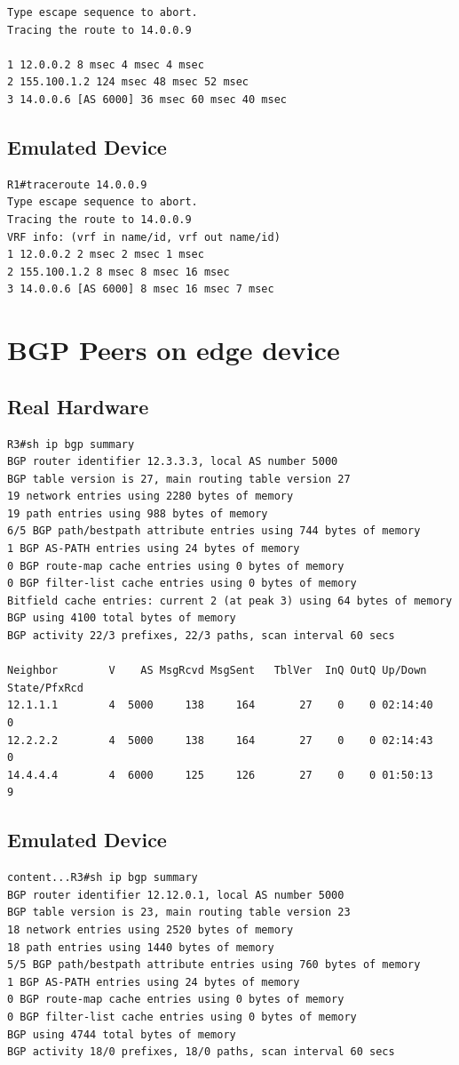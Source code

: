 \documentclass[11pt]{report}
\begin{document}
\begin{appendices}
\begin{lstlisting}
Type escape sequence to abort.
Tracing the route to 14.0.0.9

1 12.0.0.2 8 msec 4 msec 4 msec
2 155.100.1.2 124 msec 48 msec 52 msec
3 14.0.0.6 [AS 6000] 36 msec 60 msec 40 msec
\end{lstlisting}

\subsection{Emulated Device}
\begin{lstlisting}
R1#traceroute 14.0.0.9
Type escape sequence to abort.
Tracing the route to 14.0.0.9
VRF info: (vrf in name/id, vrf out name/id)
1 12.0.0.2 2 msec 2 msec 1 msec
2 155.100.1.2 8 msec 8 msec 16 msec
3 14.0.0.6 [AS 6000] 8 msec 16 msec 7 msec
\end{lstlisting}

\section{BGP Peers on edge device}

\subsection{Real Hardware}

\begin{lstlisting}
R3#sh ip bgp summary
BGP router identifier 12.3.3.3, local AS number 5000
BGP table version is 27, main routing table version 27
19 network entries using 2280 bytes of memory
19 path entries using 988 bytes of memory
6/5 BGP path/bestpath attribute entries using 744 bytes of memory
1 BGP AS-PATH entries using 24 bytes of memory
0 BGP route-map cache entries using 0 bytes of memory
0 BGP filter-list cache entries using 0 bytes of memory
Bitfield cache entries: current 2 (at peak 3) using 64 bytes of memory
BGP using 4100 total bytes of memory
BGP activity 22/3 prefixes, 22/3 paths, scan interval 60 secs

Neighbor        V    AS MsgRcvd MsgSent   TblVer  InQ OutQ Up/Down  State/PfxRcd
12.1.1.1        4  5000     138     164       27    0    0 02:14:40        0
12.2.2.2        4  5000     138     164       27    0    0 02:14:43        0
14.4.4.4        4  6000     125     126       27    0    0 01:50:13        9
\end{lstlisting}

\subsection{Emulated Device}
\begin{lstlisting}
content...R3#sh ip bgp summary
BGP router identifier 12.12.0.1, local AS number 5000
BGP table version is 23, main routing table version 23
18 network entries using 2520 bytes of memory
18 path entries using 1440 bytes of memory
5/5 BGP path/bestpath attribute entries using 760 bytes of memory
1 BGP AS-PATH entries using 24 bytes of memory
0 BGP route-map cache entries using 0 bytes of memory
0 BGP filter-list cache entries using 0 bytes of memory
BGP using 4744 total bytes of memory
BGP activity 18/0 prefixes, 18/0 paths, scan interval 60 secs


\end{lstlisting}
\end{appendices}
\end{document}

